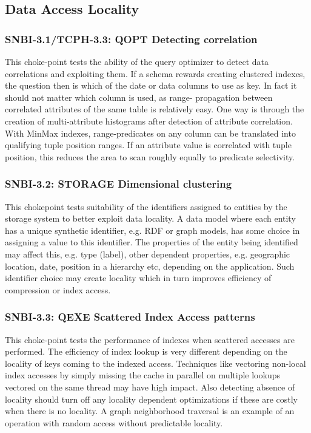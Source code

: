 \subsection{Data Access Locality}

\subsubsection{SNBI-3.1/TCPH-3.3: QOPT Detecting correlation}
\label{choke_point_3.1}
This choke-point tests the ability of the query optimizer to detect data correlations and exploiting them. If a schema rewards creating clustered indexes, the question then is which of the date or data columns to use as key.
In fact it should not matter which column is used, as range- propagation between correlated attributes of the same table is relatively easy. One way is through the creation of multi-attribute histograms after detection of attribute correlation.
With MinMax indexes, range-predicates on any column can be translated into qualifying tuple position ranges. If an attribute value is correlated with tuple position, this reduces the area to scan roughly equally to predicate selectivity.

\subsubsection{SNBI-3.2: STORAGE Dimensional clustering}
\label{choke_point_3.2}
This chokepoint tests suitability of the identifiers assigned to entities by the storage system to better exploit data locality. A data model where each entity has a unique synthetic identifier,
e.g. RDF or graph models, has some choice in assigning a value to this identifier. The properties of the entity being identified may affect this, e.g. type (label), other dependent properties,
e.g. geographic location, date, position in a hierarchy etc, depending on the application. Such identifier choice may create locality which in turn improves efficiency of compression or index access.

\subsubsection{SNBI-3.3: QEXE Scattered Index Access patterns}
\label{choke_point_3.3}
This choke-point tests the performance of indexes when scattered accesses are performed. The efficiency of index lookup is very different depending on the locality of keys coming to the indexed access.
Techniques like vectoring non-local index accesses by simply missing the cache in parallel on multiple lookups vectored on the same thread may have high impact.
Also detecting absence of locality should turn off any locality dependent optimizations if these are costly when there is no locality. A graph neighborhood traversal is an example of an operation with random access without predictable locality.

